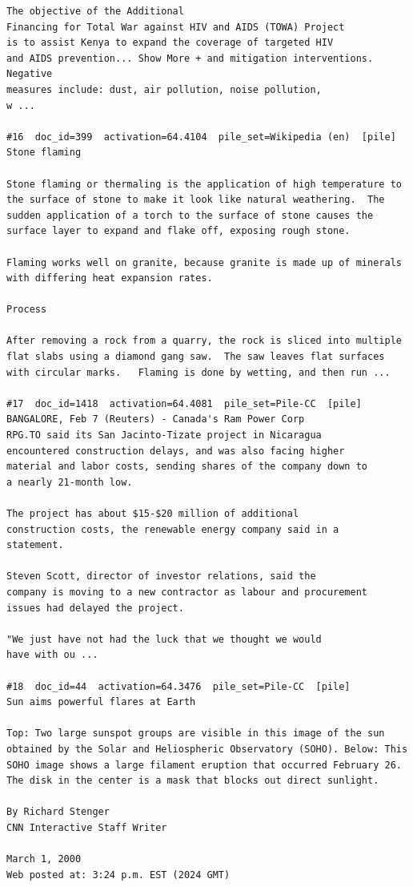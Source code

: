 \begin{verbatim}
The objective of the Additional
Financing for Total War against HIV and AIDS (TOWA) Project
is to assist Kenya to expand the coverage of targeted HIV
and AIDS prevention... Show More + and mitigation interventions. Negative
measures include: dust, air pollution, noise pollution,
w ...

#16  doc_id=399  activation=64.4104  pile_set=Wikipedia (en)  [pile]
Stone flaming

Stone flaming or thermaling is the application of high temperature to the surface of stone to make it look like natural weathering.  The sudden application of a torch to the surface of stone causes the surface layer to expand and flake off, exposing rough stone.    

Flaming works well on granite, because granite is made up of minerals with differing heat expansion rates.

Process

After removing a rock from a quarry, the rock is sliced into multiple flat slabs using a diamond gang saw.  The saw leaves flat surfaces with circular marks.   Flaming is done by wetting, and then run ...

#17  doc_id=1418  activation=64.4081  pile_set=Pile-CC  [pile]
BANGALORE, Feb 7 (Reuters) - Canada's Ram Power Corp
RPG.TO said its San Jacinto-Tizate project in Nicaragua
encountered construction delays, and was also facing higher
material and labor costs, sending shares of the company down to
a nearly 21-month low.

The project has about $15-$20 million of additional
construction costs, the renewable energy company said in a
statement.

Steven Scott, director of investor relations, said the
company is moving to a new contractor as labour and procurement
issues had delayed the project.

"We just have not had the luck that we thought we would
have with ou ...

#18  doc_id=44  activation=64.3476  pile_set=Pile-CC  [pile]
Sun aims powerful flares at Earth

Top: Two large sunspot groups are visible in this image of the sun obtained by the Solar and Heliospheric Observatory (SOHO). Below: This SOHO image shows a large filament eruption that occurred February 26. The disk in the center is a mask that blocks out direct sunlight.

By Richard Stenger
CNN Interactive Staff Writer

March 1, 2000
Web posted at: 3:24 p.m. EST (2024 GMT)


\end{verbatim}
